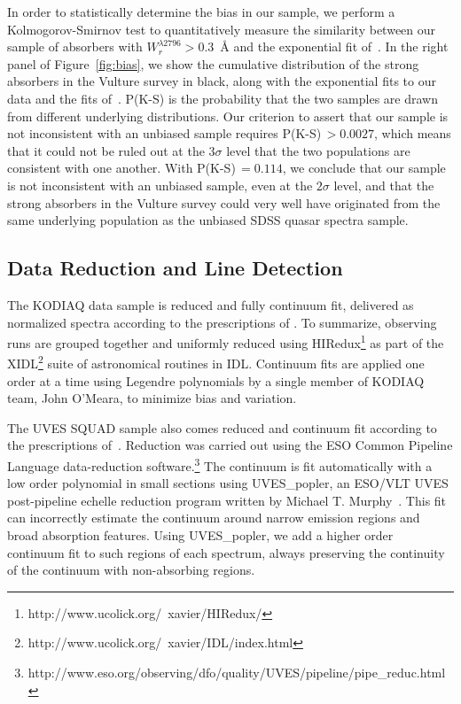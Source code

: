\documentclass[iop,apj,numberedappendix,appendixfloats,twocolappendix]{emulateapj}
\begin{document}
In order to statistically determine the bias in our sample, we perform a Kolmogorov-Smirnov test to quantitatively measure the similarity between our sample of absorbers with $W_r^{\lambda2796} > 0.3$~{\AA} and the exponential fit of~\cite{Nestor2005}. In the right panel of Figure~\ref{fig:bias}, we show the cumulative distribution of the strong absorbers in the Vulture survey in black, along with the exponential fits to our data and the fits of~\cite{Nestor2005}. P(K-S) is the probability that the two samples are drawn from different underlying distributions. Our criterion to assert that our sample is not inconsistent with an unbiased sample requires P(K-S)$\, > 0.0027$, which means that it could not be ruled out at the $3\sigma$ level that the two populations are consistent with one another. With P(K-S)$\, = 0.114$, we conclude that our sample is not inconsistent with an unbiased sample, even at the $2\sigma$ level, and that the strong absorbers in the Vulture survey could very well have originated from the same underlying population as the unbiased SDSS quasar spectra sample.


\subsection{Data Reduction and Line Detection}
\label{sec:detection}

The KODIAQ data sample is reduced and fully continuum fit, delivered as normalized spectra according to the prescriptions of \cite{OMeara2015}. To summarize, observing runs are grouped together and uniformly reduced using HIRedux\footnote{http://www.ucolick.org/~xavier/HIRedux/} as part of the XIDL\footnote{http://www.ucolick.org/~xavier/IDL/index.html} suite of astronomical routines in IDL. Continuum fits are applied one order at a time using Legendre polynomials by a single member of KODIAQ team, John O'Meara, to minimize bias and variation. 

The UVES SQUAD sample also comes reduced and continuum fit according to the prescriptions of~\cite{King2012,Bagdonaite2014,Murphy2016,Murphyprep}. Reduction was carried out using the ESO Common Pipeline Language data-reduction software.\footnote{http://www.eso.org/observing/dfo/quality/UVES/pipeline/pipe\_reduc.html} The continuum is fit automatically with a low order polynomial in small sections using UVES\_popler, an ESO/VLT UVES post-pipeline echelle reduction program written by Michael T. Murphy~\citep{MurphyPOPLER}. This fit can incorrectly estimate the continuum around narrow emission regions and broad absorption features. Using UVES\_popler, we add a higher order continuum fit to such regions of each spectrum, always preserving the continuity of the continuum with non-absorbing regions. 
\end{document}
